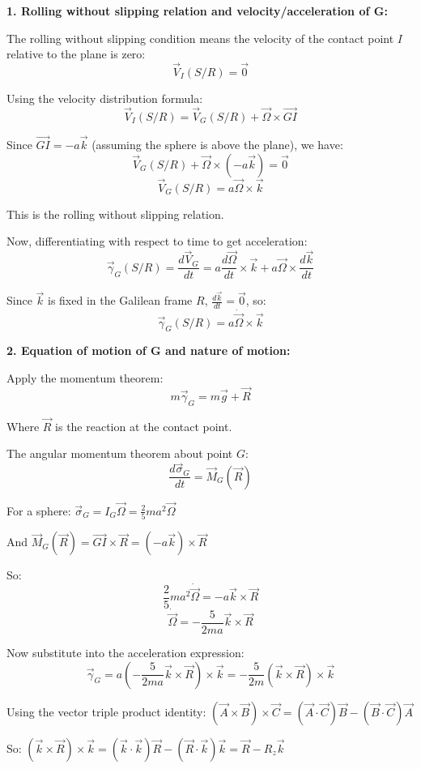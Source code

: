 \documentclass[12pt]{article}
\begin{document}
\begin{correctionbox}
\textbf{1. Rolling without slipping relation and velocity/acceleration of G:}

The rolling without slipping condition means the velocity of the contact point $I$ relative to the plane is zero:
$$\vec{V}_I(S/R) = \vec{0}$$

Using the velocity distribution formula:
$$\vec{V}_I(S/R) = \vec{V}_G(S/R) + \vec{\Omega} \times \vec{GI}$$

Since $\vec{GI} = -a\vec{k}$ (assuming the sphere is above the plane), we have:
$$\vec{V}_G(S/R) + \vec{\Omega} \times (-a\vec{k}) = \vec{0}$$
$$\vec{V}_G(S/R) = a\vec{\Omega} \times \vec{k}$$

This is the rolling without slipping relation.

Now, differentiating with respect to time to get acceleration:
$$\vec{\gamma}_G(S/R) = \frac{d\vec{V}_G}{dt} = a\frac{d\vec{\Omega}}{dt} \times \vec{k} + a\vec{\Omega} \times \frac{d\vec{k}}{dt}$$

Since $\vec{k}$ is fixed in the Galilean frame $R$, $\frac{d\vec{k}}{dt} = \vec{0}$, so:
$$\vec{\gamma}_G(S/R) = a\dot{\vec{\Omega}} \times \vec{k}$$

\textbf{2. Equation of motion of G and nature of motion:}

Apply the momentum theorem:
$$m\vec{\gamma}_G = m\vec{g} + \vec{R}$$

Where $\vec{R}$ is the reaction at the contact point.

The angular momentum theorem about point $G$:
$$\frac{d\vec{\sigma}_G}{dt} = \vec{M}_G(\vec{R})$$

For a sphere: $\vec{\sigma}_G = I_G\vec{\Omega} = \frac{2}{5}ma^2\vec{\Omega}$

And $\vec{M}_G(\vec{R}) = \vec{GI} \times \vec{R} = (-a\vec{k}) \times \vec{R}$

So:
$$\frac{2}{5}ma^2\dot{\vec{\Omega}} = -a\vec{k} \times \vec{R}$$
$$\dot{\vec{\Omega}} = -\frac{5}{2ma}\vec{k} \times \vec{R}$$

Now substitute into the acceleration expression:
$$\vec{\gamma}_G = a\left(-\frac{5}{2ma}\vec{k} \times \vec{R}\right) \times \vec{k} = -\frac{5}{2m}(\vec{k} \times \vec{R}) \times \vec{k}$$

Using the vector triple product identity: $(\vec{A} \times \vec{B}) \times \vec{C} = (\vec{A} \cdot \vec{C})\vec{B} - (\vec{B} \cdot \vec{C})\vec{A}$

So: $(\vec{k} \times \vec{R}) \times \vec{k} = (\vec{k} \cdot \vec{k})\vec{R} - (\vec{R} \cdot \vec{k})\vec{k} = \vec{R} - R_z\vec{k}$


\end{correctionbox}
\end{document}
